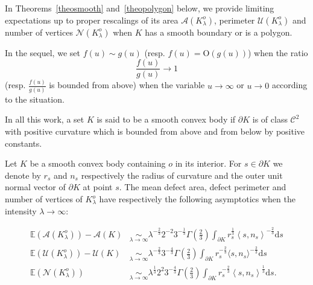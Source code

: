 \documentclass[AHL,Unicode,longabstracts,published]{cedram}
\newcommand{\cA}{\mathcal{A}}
\newcommand{\cC}{\mathcal{C}}
\newcommand{\cN}{\mathcal{N}}
\newcommand{\cU}{\mathcal{U}}
\newcommand{\dd}{\mathrm{d}}
\newcommand{\Odd}{\mathrm{O}}
\newcommand{\E}{\mathbb{E}}
\newcommand{\pass}{\vspace{0.3cm}\noindent}
\begin{document}
In Theorems~\ref{theosmooth} and~\ref{theopolygon} below, we provide limiting expectations up to proper rescalings of its area $\cA(K_{\lambda}^o)$, perimeter $\cU(K_{\lambda}^o)$ and number of vertices $\cN(K_{\lambda}^o)$ when $K$ has a smooth boundary or is a polygon.

In the sequel, we set $f(u){\sim} g(u)$ (resp. $f(u){=}\Odd(g(u))$) when the ratio
\[
\frac{f(u)}{g(u)} \to 1
\]
(resp. $\tfrac{f(u)}{g(u)}$ is bounded from above) when the variable $u\to\infty$ or $u\to0$ according to the situation.

In all this work, a set $K$ is said to be a smooth convex body if $\partial K$ is of class $\cC^2$ with positive curvature which is bounded from above and from below by positive constants.

\begin{theo}\label{theosmooth}
Let $K$ be a smooth convex body containing $o$ in its interior. For $s\in\partial K$ we denote by $r_s$ and $n_s$ respectively the radius of curvature and the outer unit normal vector of $\partial K$ at point $s$. The mean defect area, defect perimeter and number of vertices of $K_{\lambda}^o$ have respectively the following asymptotics when the intensity $\lambda\to\infty:$

\begin{align}
\tag{$\rm i$} \E(\cA(K_{\lambda}^o))-\cA(K)  &\underset{\lambda\to\infty}{\sim}
\lambda^{-\frac{2}{3}} 2^{-2}3^{-\frac1{3}}\Gamma\left(\frac{2}{3}\right)\int_{\partial K} r_s^{\frac1{3}}\left\langle s,n_s\right\rangle^{-\frac{2}{3}}\dd s\label{theo1.1.i}\\
\tag{$\rm ii$} \E(\cU(K_{\lambda}^o))-\cU(K) &\underset{\lambda\to\infty}{\sim}
\lambda^{-\frac{2}{3}} 3^{-\frac{4}{3}}\Gamma\left(\frac{2}{3}\right)\int_{\partial K} r_s^{-\frac{2}{3}}\langle s,n_s\rangle^{-\frac{2}{3}}\dd s \label{theo1.1.ii}\\
\tag{$\rm iii$}\label{theo1.1.iii} \E(\cN(K_{\lambda}^o)) &\underset{\lambda\to\infty}{\sim}
\lambda^{\frac{1}{3}}2^2 3^{-\frac{4}{3}}\Gamma\left(\frac{2}{3}\right)\int_{\partial K} r_s^{-\frac{2}{3}}\left\langle s,n_s\right\rangle^{\frac1{3}}\dd s.
\end{align}
\end{theo}

\end{document}
